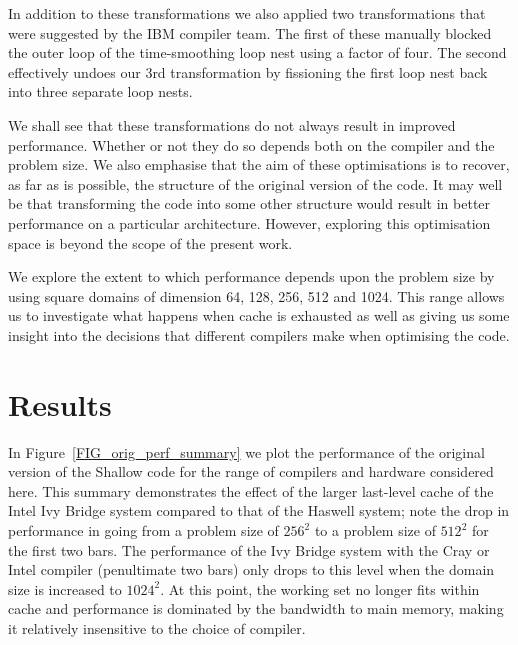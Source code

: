 \documentclass{IOS-Book-Article}
\begin{document}
In addition to these transformations we also applied two
transformations that were suggested by the IBM compiler team. The
first of these manually blocked the outer loop of the time-smoothing
loop nest using a factor of four. The second effectively undoes our 3rd
transformation by fissioning the first loop nest back into three
separate loop nests.

We shall see that these transformations do not always result in improved
performance. Whether or not they do so depends both on the compiler
and the problem size. We also emphasise that the aim of these
optimisations is to recover, as far as is possible, the structure of
the original version of the code. It may well be that transforming the
code into some other structure would result in better performance on a
particular architecture. However, exploring this optimisation space is
beyond the scope of the present work.

We explore the extent to which performance depends upon the problem
size by using square domains of dimension 64, 128, 256, 512 and
1024. This range allows us to investigate what happens when cache is
exhausted as well as giving us some insight into the decisions that
different compilers make when optimising the code.

\section{Results}

In Figure~\ref{FIG_orig_perf_summary} we plot the performance of the
original version of the Shallow code for the range of compilers and
hardware considered here. This summary demonstrates the effect of the
larger last-level cache of the Intel Ivy Bridge system compared to
that of the Haswell system; note the drop in performance
in going from a problem size of $256^{2}$ to a problem size of
$512^{2}$ for the first two bars. The performance of the Ivy
Bridge system with the Cray or Intel compiler (penultimate two bars)
only drops to this level when the domain size is increased to
$1024^{2}$. At this point, the working set no longer fits within cache
and performance is dominated by the bandwidth to main memory, making
it relatively insensitive to the choice of compiler.

\end{document}
